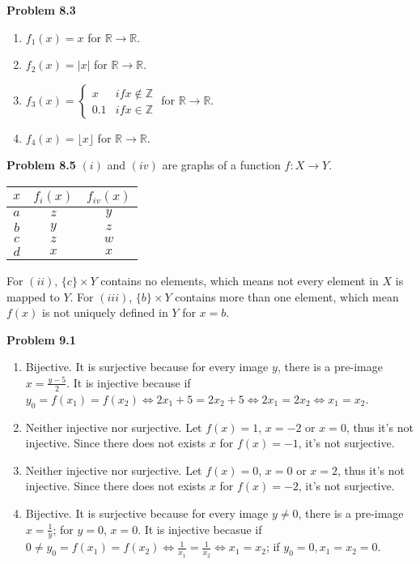\documentclass{article}
\begin{document}
\textbf{Problem 8.3}
\begin{enumerate}[label={(\roman*)}]
    \item $f_1(x)=x$ for $\mathbb{R}\rightarrow\mathbb{R}$.
    \item $f_2(x)=|x|$  for $\mathbb{R}\rightarrow\mathbb{R}$.
    \item $f_3(x)=\begin{cases}
        x & if x\not\in\mathbb{Z} \\
        0.1 & if x\in\mathbb{Z}
    \end{cases}$ for $\mathbb{R}\rightarrow\mathbb{R}$.
    \item $f_4(x)=\lfloor x\rfloor$ for $\mathbb{R}\rightarrow\mathbb{R}$.
\end{enumerate}
\bigbreak

\textbf{Problem 8.5}
$(i)$ and $(iv)$ are graphs of a function $f:X\rightarrow Y$.
\begin{center}
    \begin{tabular}{ |c|c c| } 
     \hline
     $x$ & $f_i(x)$ & $f_{iv}(x)$  \\ 
     \hline
     $a$ & $z$ & $y$ \\ 
     $b$ & $y$ & $z$ \\ 
     $c$ & $z$ & $w$ \\ 
     $d$ & $x$ & $x$ \\ 
     \hline
    \end{tabular}
\end{center}

For $(ii)$, $\{c\}\times Y$ contains no elements, which means not every element in $X$ is mapped to $Y$. 
For $(iii)$, $\{b\}\times Y$ contains more than one element, which mean $f(x)$ is not uniquely defined in $Y$ for $x=b$.
\bigbreak

\textbf{Problem 9.1}
\begin{enumerate}[label={(\roman*)}]
    \item Bijective. It is surjective because for every image $y$, there is a pre-image $x=\frac{y-5}{2}$. It is injective because if $y_0=f(x_1)=f(x_2)\Leftrightarrow 2x_1+5=2x_2+5\Leftrightarrow 2x_1=2x_2 \Leftrightarrow x_1=x_2$.
    \item Neither injective nor surjective. Let $f(x)=1$, $x=-2$ or $x=0$, thus it's not injective. Since there does not exists $x$ for $f(x)=-1$, it's not surjective.
    \item Neither injective nor surjective. Let $f(x)=0$, $x=0$ or $x=2$, thus it's not injective. Since there does not exists $x$ for $f(x)=-2$, it's not surjective.
    \item Bijective. It is surjective because for every image $y\neq 0$, there is a pre-image $x=\frac{1}{y}$; for $y=0$, $x=0$. It is injective becasue if $0\neq y_0 =f(x_1)=f(x_2)\Leftrightarrow \frac{1}{x_1}=\frac{1}{x_2}\Leftrightarrow x_1=x_2$; if $y_0=0,x_1=x_2=0$.
\end{enumerate}
\bigbreak
\end{document}
